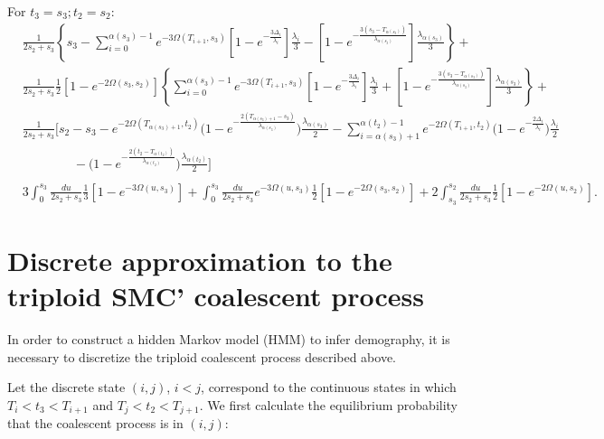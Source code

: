 \documentclass{article}
\begin{document}
For $t_3=s_3; t_2=s_2$:
\begin{align*}
    &\frac{1}{2s_2+s_3}
    \left\{s_3 - \sum_{i=0}^{\alpha(s_3)-1}e^{-3\Omega(T_{i+1},s_3)}
        \left[1-e^{-\frac{3\Delta_i}{\lambda_i}}\right]\frac{\lambda_i}{3}-
    \left[1-e^{-\frac{3\left(s_3-T_{\alpha(s_3)}\right)}{\lambda_{\alpha(s_3)}}}\right]
        \frac{\lambda_{\alpha(s_3)}}{3}\right\}+\\
    &\frac{1}{2s_2+s_3}\frac{1}{2}\left[1-e^{-2\Omega(s_3,s_2)}\right]
    \left\{\sum_{i=0}^{\alpha(s_3)-1}e^{-3\Omega(T_{i+1},s_3)}
        \left[1-e^{-\frac{3\Delta_i}{\lambda_i}}\right]\frac{\lambda_i}{3}+
    \left[1-e^{-\frac{3\left(s_3-T_{\alpha(s_3)}\right)}{\lambda_{\alpha(s_3)}}}\right]
        \frac{\lambda_{\alpha(s_3)}}{3}\right\}+\\
        &\frac{1}{2s_2+s_3}\Bigg[s_2-s_3-e^{-2\Omega(T_{\alpha(s_3)+1},t_2)}\Bigg(1-e^{-\frac{2\left(T_{\alpha(s_3)+1}-s_3\right)}{\lambda_{\alpha(s_3)}}}\Bigg)\frac{\lambda_{\alpha(s_3)}}{2}-\sum_{i=\alpha(s_3)+1}^{\alpha(t_2)-1}e^{-2\Omega\left(T_{i+1},t_2\right)}\Bigg(1-e^{-\frac{2\Delta_i}{\lambda_i}}\Bigg)\frac{\lambda_i}{2}\\
    &\qquad\qquad-\Bigg(1-e^{-\frac{2\left(t_2-T_{\alpha(t_2)}\right)}{\lambda_{\alpha(t_2)}}}\Bigg)\frac{\lambda_{\alpha(t_2)}}{2}
    \Bigg]\\
    \\
    &3\int_0^{s_3}\frac{du}{2s_2+s_3}\frac{1}{3}\left[1-e^{-3\Omega(u,s_3)}\right]+\int_0^{s_3}\frac{du}{2s_2+s_3}e^{-3\Omega(u,s_3)}\frac{1}{2}\left[1-e^{-2\Omega(s_3,s_2)}\right]+2\int_{s_3}^{s_2}\frac{du}{2s_2+s_3}\frac{1}{2}\left[1-e^{-2\Omega(u,s_2)}\right].
\end{align*}

\section{Discrete approximation to the triploid SMC' coalescent process}

In order to construct a hidden Markov model (HMM) to infer demography, it is
necessary to discretize the triploid coalescent process described above.

Let the discrete state $(i,j)$, $i<j$, correspond to the continuous states in which ${T_i
< t_3 < T_{i+1}}$ and ${T_j < t_2 < T_{j+1}}$. We first calculate the equilibrium
probability that the coalescent process is in $(i,j)$:
\end{document}
